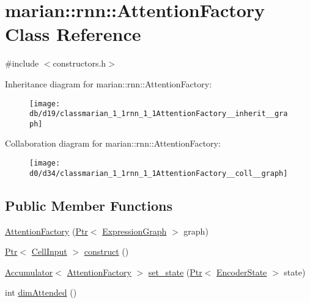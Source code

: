 \hypertarget{classmarian_1_1rnn_1_1AttentionFactory}{}\section{marian\+:\+:rnn\+:\+:Attention\+Factory Class Reference}
\label{classmarian_1_1rnn_1_1AttentionFactory}


{\ttfamily \#include $<$constructors.\+h$>$}



Inheritance diagram for marian\+:\+:rnn\+:\+:Attention\+Factory\+:
\nopagebreak
\begin{figure}[H]
\begin{center}
\leavevmode
\texttt{[image: db/d19/classmarian\_1\_1rnn\_1\_1AttentionFactory\_\_inherit\_\_graph]}
\end{center}
\end{figure}


Collaboration diagram for marian\+:\+:rnn\+:\+:Attention\+Factory\+:
\nopagebreak
\begin{figure}[H]
\begin{center}
\leavevmode
\texttt{[image: d0/d34/classmarian\_1\_1rnn\_1\_1AttentionFactory\_\_coll\_\_graph]}
\end{center}
\end{figure}
\subsection*{Public Member Functions}
\begin{DoxyCompactItemize}
\item 
\hyperlink{classmarian_1_1rnn_1_1AttentionFactory_ac29b6943ef7485c30662265deb36fef1}{Attention\+Factory} (\hyperlink{namespacemarian_ad1a373be43a00ef9ce35666145137b08}{Ptr}$<$ \hyperlink{classmarian_1_1ExpressionGraph}{Expression\+Graph} $>$ graph)
\item 
\hyperlink{namespacemarian_ad1a373be43a00ef9ce35666145137b08}{Ptr}$<$ \hyperlink{classmarian_1_1rnn_1_1CellInput}{Cell\+Input} $>$ \hyperlink{classmarian_1_1rnn_1_1AttentionFactory_ad40def6ee2a38873a116fd80dd4916f1}{construct} ()
\item 
\hyperlink{classmarian_1_1Accumulator}{Accumulator}$<$ \hyperlink{classmarian_1_1rnn_1_1AttentionFactory}{Attention\+Factory} $>$ \hyperlink{classmarian_1_1rnn_1_1AttentionFactory_abcd9aae6d8cbe7c73c8b0d1598372312}{set\+\_\+state} (\hyperlink{namespacemarian_ad1a373be43a00ef9ce35666145137b08}{Ptr}$<$ \hyperlink{classmarian_1_1EncoderState}{Encoder\+State} $>$ state)
\item 
int \hyperlink{classmarian_1_1rnn_1_1AttentionFactory_ace65b44df01b174a1d730bdd7db36d60}{dim\+Attended} ()
\end{DoxyCompactItemize}
